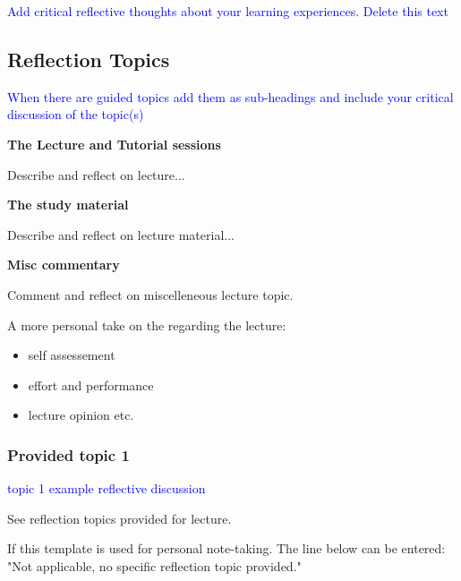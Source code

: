 {{\textcolor{blue}{Add critical reflective thoughts about your learning experiences. Delete this text}}



\subsection{Reflection Topics}

{\textcolor{blue}{When there are guided topics add them as sub-headings and include your critical discussion of the topic(s)}}

{\bfseries{The Lecture and Tutorial sessions}}

\begin{followup}
    Describe and reflect on lecture...
\end{followup}

{\bfseries{The study material}}


\begin{followup}
    Describe and reflect on lecture material...
\end{followup}

{\bfseries{Misc commentary}}


\begin{followup}
    Comment and reflect on miscelleneous lecture topic.

    A more personal take on the regarding the lecture:
    \begin{itemize}
        \item self assessement
        \item effort and performance
        \item lecture opinion etc.
    \end{itemize}
\end{followup}


\subsubsection{Provided topic 1}

{\textcolor{blue}{topic 1 example reflective discussion}}

\begin{followup}[]
    See reflection topics provided for lecture.

    If this template is used for personal note-taking. The line below can be entered:
    "Not applicable, no specific reflection topic provided."
\end{followup}


}
